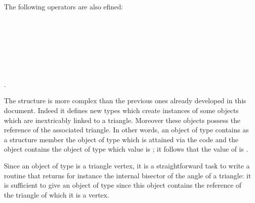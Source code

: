 \documentclass[pdftex]{article}
\begin{document}
The following operators are also efined:\\
\\
\\
\\
\\
\\
\\
\\
.

The  structure is more complex than the previous ones
already developed in this document. Indeed it defines new types which
create instances of some objects which are inextricably linked to a
triangle. Moreover these objects possess the reference of the
associated triangle.
In other words, an object  of type  contains
as a structure member the
object  of type  which is attained via the
code  and the object  contains the object  of type
 which value is ; it follows that the value
of  is .

Since an object of type  is a triangle vertex, it is a
straightforward task to write a routine that returns for instance the
internal bisector of the angle of a triangle: it is sufficient to give
an object of type  since this object contains the
reference of the triangle of which it is a vertex.
\end{document}
